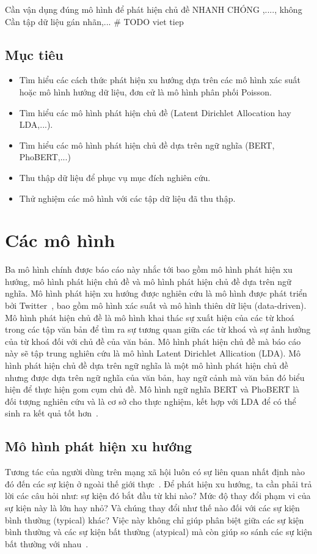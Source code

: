 Cần vận dụng đúng mô hình để phát hiện chủ đề NHANH CHÓNG ,...., không Cần
tập dữ liệu gán nhãn,...
\# TODO viet tiep

\subsection{Mục tiêu}
\begin{itemize}
	\item Tìm hiểu các cách thức phát hiện xu hướng dựa trên các mô hình xác
		suất hoặc mô hình hướng dữ liệu, đơn cử là mô hình phân phối Poisson.

	\item Tìm hiểu các mô hình phát hiện chủ đề (Latent Dirichlet Allocation
		hay LDA,...).

	\item Tìm hiểu các mô hình phát hiện chủ đề dựa trên ngữ nghĩa (BERT,
		PhoBERT,...)
	
	\item Thu thập dữ liệu để phục vụ mục đích nghiên cứu.
	
	\item Thử nghiệm các mô hình với các tập dữ liệu đã thu thập.
\end{itemize}

\section{Các mô hình}
\label{sec:models}
Ba mô hình chính được báo cáo này nhắc tới bao gồm mô hình phát hiện xu
hướng, mô hình phát hiện chủ đề và mô hình phát hiện chủ đề dựa trên ngữ nghĩa.
Mô hình phát hiện xu hướng được nghiên cứu là mô hình được phát triển bởi
Twitter~\cite{hendricksonTrendDetectionSocial2015}, bao gồm mô hình xác suất và
mô hình thiên dữ liệu (data-driven). Mô hình phát hiện chủ đề là mô hình khai
thác sự xuất hiện của các từ khoá trong các tập văn bản để tìm ra sự tương quan
giữa các từ khoá và sự ảnh hưởng của từ khoá đối với chủ đề của văn bản. Mô
hình phát hiện chủ đề mà báo cáo này sẽ tập trung nghiên cứu là mô hình Latent
Dirichlet Allication (LDA). Mô hình phát hiện chủ đề dựa trên ngữ nghĩa là một
mô hình phát hiện chủ đề nhưng được dựa trên ngữ nghĩa của văn bản, hay ngữ
cảnh mà văn bản đó biểu hiện để thực hiện gom cụm chủ đề. Mô hình ngữ nghĩa
BERT và PhoBERT là đối tượng nghiên cứu và là cơ sở cho thực nghiệm, kết hợp
với LDA để có thể sinh ra kết quả tốt hơn~\cite{lamGomCumVan2021}.

\subsection{Mô hình phát hiện xu hướng}
Tương tác của người dùng trên mạng xã hội luôn có sự liên quan nhất định nào đó
đến các sự kiện ở ngoài thế giới
thực~\cite{hendricksonTrendDetectionSocial2015}. Để phát hiện xu hướng, ta cần
phải trả lời các câu hỏi như: sự kiện đó bắt đầu từ khi nào? Mức độ thay đổi
phạm vi của sự kiện này là lớn hay nhỏ? Và chúng thay đổi như thế nào đối với
các sự kiện bình thường (typical) khác? Việc này không chỉ giúp phân biệt giữa
các sự kiện bình thường và các sự kiện bất thường (atypical) mà còn giúp so
sánh các sự kiện bất thường với
nhau~\cite{hendricksonTrendDetectionSocial2015}.

